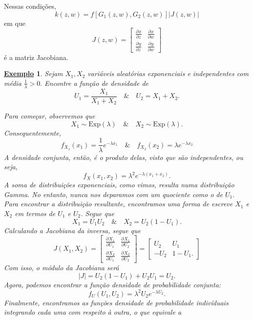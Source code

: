 \documentclass{article}
\newtheorem{example}{\underline{Exemplo}}
\begin{document}
Nessas condições, 
\[
  k(z, w) = f[G_1(z, w), G_{2}(z, w)]|J(z, w)|
\]
em que 
\[
  J(z, w) = \begin{bmatrix}
    \frac{\partial^{}x}{\partial z^{}} & \frac{\partial^{}x}{\partial w^{}}\\
    \frac{\partial^{}y}{\partial z^{}} & \frac{\partial^{}y}{\partial w^{}}
  \end{bmatrix}
\]
é a matriz Jacobiana.
\begin{example}
  Sejam \(X_{1}, X_{2}\) variáveis aleatórias exponenciais e independentes com média \(\frac{1}{\lambda } > 0.\) Encontre a função de densidade de 
  \[
    U_{1}=\frac{X_{1}}{X_{1}+X_{2}}\quad\&\quad U_{2} = X_{1} + X_2.
  \] 

  Para começar, observemos que 
  \[
    X_{1}\sim \mathrm{Exp}(\lambda )\quad\&\quad X_{2}\sim \mathrm{Exp}(\lambda).
  \]
  Consequentemente, 
  \[
    f_{X_{1}}(x_{1}) = \frac{1}{\lambda }e^{-\lambda x_{1}}\quad\&\quad f_{X_{2}}(x_{2}) = \lambda e^{-\lambda x_{2}} 
  \]
  A densidade conjunta, então, é o produto delas, visto que são independentes, ou seja,
  \[
    f_{X}(x_{1},x_{2}) = \lambda^{2}e^{-\lambda (x_{1}+x_{2})}.
  \]
  A soma de distribuições exponenciais, como vimos, resulta numa distribuição Gamma. No entanto, nunca nos deparamos
  com um quociente como o de \(U_{1}.\) Para encontrar a distribuição resultante, encontramos uma forma de escreve \(X_{1}\) e \(X_{2}\)
  em termos de \(U_{1}\) e \(U_{2}\). Segue que 
  \[
    X_{1} = U_{1}U_{2}\quad\&\quad X_{2} = U_{2} (1-U_{1}).
  \]
  Calculando a Jacobiana da inversa, segue que 
  \[
    J(X_{1}, X_{2}) = \begin{bmatrix}
      \frac{\partial^{}X_{1}}{\partial U_{1}^{}} & \frac{\partial^{}X_{1}}{\partial U_{2}^{}}\\
      \frac{\partial^{}X_{2}}{\partial U_{1}^{}} & \frac{\partial^{}X_{2}}{\partial U_{2}^{}}
    \end{bmatrix}
    = \begin{bmatrix}
      U_{2} & U_{1}\\
      -U_{2} & 1 - U_{1}.
    \end{bmatrix}
  \]
  Com isso, o módulo da Jacobiana será 
  \[
    |J| = U_2(1-U_{1}) + U_{2}U_{1} = U_{2}.
  \]
  Agora, podemos encontrar a função densidade de probabilidade conjunta:
  \[
    f_{U}(U_{1}, U_{2}) = \lambda ^{2}U_{2}e^{-\lambda U_{2}}.
  \]
  Finalmente, encontramos as funções densidade de probabilidade indivíduais integrando cada uma com respeito à outra, o que equivale a
  \begin{align*}

\end{align*}
\end{example}
\end{document}
